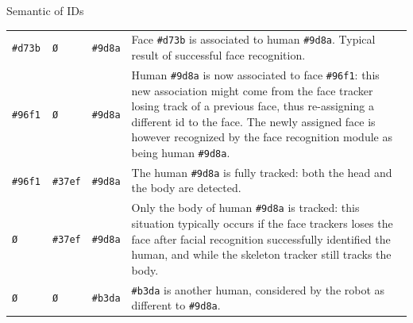 \documentclass[xcolor=table]{beamer}
\begin{document}
\begin{frame}{Semantic of IDs}
\begin{tabular}{@{}lllp{6.5cm}@{}}
        \texttt{\#d73b }          & \texttt{Ø     }           & \texttt{\#9d8a}             & \tiny Face \texttt{\#d73b} is associated to human \texttt{\#9d8a}. Typical result of successful face recognition.                                                                                                                                                                                               \\
        \texttt{\#96f1 }          & \texttt{Ø     }           & \texttt{\#9d8a}             & \tiny Human \texttt{\#9d8a} is now associated to face \texttt{\#96f1}: this new association might come from the face tracker losing track of a previous face, thus re-assigning a different id to the face. The newly assigned face is however recognized by the face recognition module as being human \texttt{\#9d8a}. \\
        \texttt{\#96f1 }          & \texttt{\#37ef}           & \texttt{\#9d8a}             & \tiny The human \texttt{\#9d8a} is fully tracked: both the head and the body are detected.                                                                                                                                                                                                             \\
        \texttt{Ø      }          & \texttt{\#37ef}           & \texttt{\#9d8a}             & \tiny Only the body of human \texttt{\#9d8a} is tracked: this situation typically occurs if the face trackers loses the face after facial recognition successfully identified the human, and while the skeleton tracker still tracks the body.                                                         \\
        \texttt{Ø      }          & \texttt{Ø     }           & \texttt{\#b3da}             & \tiny \texttt{\#b3da} is another human, considered by the robot as different to \texttt{\#9d8a}.                                                                                                                                                                                                      \\ \bottomrule
\end{tabular}
\end{frame}
\end{document}
